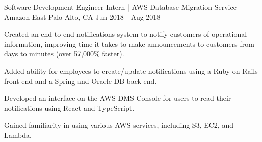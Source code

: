 \begin{cventries}
  \cventry
  {Software Development Engineer Intern | AWS Database Migration Service} %
  {Amazon} %
  {East Palo Alto, CA} %
  {Jun 2018 - Aug 2018} %
  {
    \begin{cvitems} %
      \item {Created an end to end notifications system to notify customers of operational information, improving time it takes to make announcements to customers from days to minutes (over 57,000\% faster).}
      \item {Added ability for employees to create/update notifications using a Ruby on Rails front end and a Spring and Oracle DB back end.}
      \item {Developed an interface on the AWS DMS Console for users to read their notifications using React and TypeScript.}
      \item {Gained familiarity in using various AWS services, including S3, EC2, and Lambda.}
    \end{cvitems}
  }


\end{cventries}
